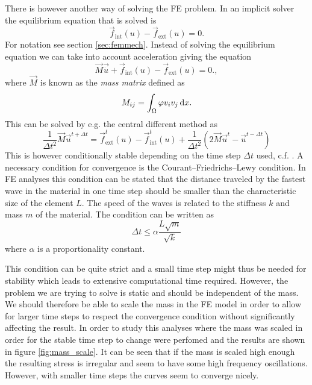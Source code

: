 \documentclass[grain_boundary_law.tex]{subfiles}
\begin{document}
There is however another way of solving the FE problem. In an implicit solver the equilibrium equation that is solved is
\begin{equation}
  \vec{f}_\text{int}(u) -  \vec{f}_\text{ext}(u) = 0.
\end{equation}
%
For notation see section \ref{sec:femmech}. Instead of solving the equilibrium equation we can take into account acceleration giving the equation
%
\begin{equation}
 \vec{M}\vec{\ddot{u}} + \vec{f}_\text{int}(u) -  \vec{f}_\text{ext}(u) = 0.,
\end{equation}
%
where $\vec{M}$ is known as the  \textit{mass matrix} defined as
%
\begin{equation}
M_{ij} = \int_\Omega \varphi v_i v_j \, \mathrm{d} x.
\end{equation}
%
This can be solved by e.g. the central different method as
%
\begin{equation}
\frac{1}{\Delta t^2} \vec{M} \vec{u}^{t + \Delta t} = \vec{f}^{t}_\text{ext}(u) - \vec{f}^{t}_\text{int}(u) + \frac{1}{\Delta t^2} \left(2 \vec{M} \vec{u}^{t} - \vec{u}^{t-\Delta t} \right)
\end{equation}
This is however conditionally stable depending on the time step $\Delta t$ used, c.f. \cite{Park1977343}. A necessary condition for convergence is the  Courant–Friedrichs–Lewy condition. In FE analyses this condition can be stated that the distance traveled by the fastest wave in the material in one time step should be smaller than the characteristic size of the element $L$. The speed of the waves is related to the stiffness $k$ and mass $m$ of the material. The condition can be written as
\begin{equation}
\Delta t \leq \alpha \frac{L \sqrt{m}}{\sqrt{k}}
\end{equation}
where $\alpha$ is a proportionality constant.

This condition can be quite strict and a small time step might thus be needed for stability which leads to extensive computational time required. However, the problem we are trying to solve is static and should be independent of the mass. We should therefore be able to scale the mass in the FE model in order to allow for larger time steps to respect the convergence condition without significantly affecting the result. In order to study this analyses where the mass was scaled in order for the stable time step to change were perfomed and the results are shown in figure \ref{fig:mass_scale}. It can be seen that if the mass is scaled high enough the resulting stress is irregular and seem to have some high frequency oscillations. However, with smaller time steps the curves seem to converge nicely. 
\end{document}
